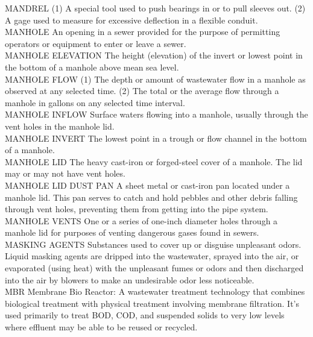 \documentclass{article}
\begin{document}
MANDREL
(1) A special tool used to push bearings in or to pull sleeves out. (2) A gage used to measure for excessive deflection in a flexible conduit. 
\vspace{0.3cm}\\
MANHOLE
An opening in a sewer provided for the purpose of permitting operators or equipment to enter or leave a sewer. 
\vspace{0.3cm}\\
MANHOLE ELEVATION
The height (elevation) of the invert or lowest point in the bottom of a manhole above mean sea level. 
\vspace{0.3cm}\\
MANHOLE FLOW
(1) The depth or amount of wastewater flow in a manhole as observed at any selected time. (2) The total or the average flow through a manhole in gallons on any selected time interval.
\vspace{0.3cm}\\
MANHOLE INFLOW
Surface waters flowing into a manhole, usually through the vent holes in the manhole lid. 
\vspace{0.3cm}\\
MANHOLE INVERT
The lowest point in a trough or flow channel in the bottom of a manhole. 
\vspace{0.3cm}\\
MANHOLE LID
The heavy cast-iron or forged-steel cover of a manhole. The lid may or may not have vent holes. 
\vspace{0.3cm}\\
MANHOLE LID DUST PAN
A sheet metal or cast-iron pan located under a manhole lid. This pan serves to catch and hold pebbles and other debris falling through vent holes, preventing them from getting into the pipe system. 
\vspace{0.3cm}\\
MANHOLE VENTS
One or a series of one-inch diameter holes through a manhole lid for purposes of venting dangerous gases found in sewers. 
\vspace{0.3cm}\\
MASKING AGENTS
Substances used to cover up or disguise unpleasant odors. Liquid masking agents are dripped into the wastewater, sprayed into the air, or evaporated (using heat) with the unpleasant fumes or odors and then discharged into the air by blowers to make an undesirable odor less noticeable.
\vspace{0.3cm}\\
MBR
Membrane Bio Reactor:  A wastewater treatment technology that combines biological treatment with physical treatment involving membrane filtration. It’s used primarily to treat BOD, COD, and suspended solids to very low levels where effluent may be able to be reused or recycled.
\end{document}
